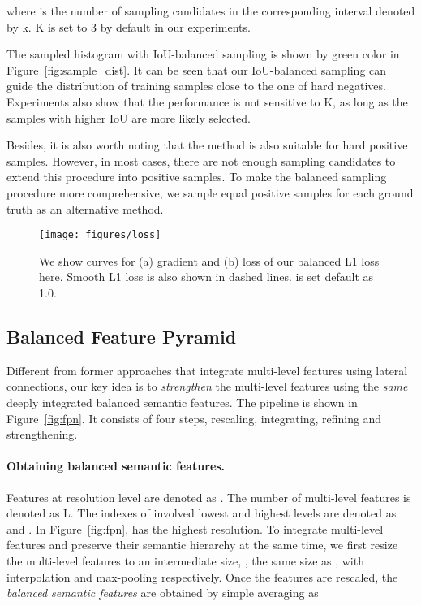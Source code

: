 \documentclass[10pt,twocolumn,letterpaper]{article}
\begin{document}
where  is the number of sampling candidates in the corresponding interval denoted by k.
K is set to 3 by default in our experiments.

The sampled histogram with IoU-balanced sampling is shown by green color in Figure~\ref{fig:sample_dist}.
It can be seen that our IoU-balanced sampling can guide the distribution of training samples close to the one of hard negatives.
Experiments also show that the performance is not sensitive to K,
as long as the samples with higher IoU are more likely selected.

Besides, it is also worth noting that the method is also suitable for hard positive samples.
However, in most cases, there are not enough sampling candidates to extend this procedure into positive samples.
To make the balanced sampling procedure more comprehensive,
we sample equal positive samples for each ground truth as an alternative method.


\begin{figure*}
	\centering
	\texttt{[image: figures/loss]}
	\caption{We show curves for (a) gradient and (b) loss of our balanced L1 loss here. Smooth L1 loss is also shown in dashed lines.  is set default as 1.0.}
	\label{fig:loss}
	\vspace{-10pt}
\end{figure*}

\subsection{Balanced Feature Pyramid}
Different from former approaches\cite{fpn,panet} that integrate multi-level features using lateral connections,
our key idea is to \emph{strengthen} the multi-level features using the \emph{same} deeply integrated balanced semantic features.
The pipeline is shown in Figure~\ref{fig:fpn}.
It consists of four steps, rescaling, integrating, refining and strengthening.

\vspace{-12pt}
\paragraph{Obtaining balanced semantic features.}
Features at resolution level  are denoted as .
The number of multi-level features is denoted as L.
The indexes of involved lowest and highest levels are denoted as  and .
In Figure~\ref{fig:fpn},  has the highest resolution.
To integrate multi-level features and preserve their semantic hierarchy at the same time, we first resize the multi-level features  to an intermediate size, \ie, the same size as , with interpolation and max-pooling respectively.
Once the features are rescaled, the \emph{balanced semantic features} are obtained by simple averaging as
\end{document}
